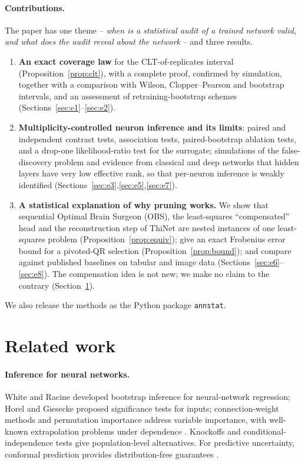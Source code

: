\documentclass[11pt,a4paper]{article}
\theoremstyle{remark}\newtheorem{remark}{Remark}
\begin{document}
\paragraph{Contributions.} The paper has one theme -- \emph{when is a statistical audit of a trained network valid, and what does the audit reveal about the network} -- and three results.
\begin{enumerate}[leftmargin=*,itemsep=1pt]
\item \textbf{An exact coverage law} for the CLT-of-replicates interval (Proposition~\ref{prop:clt}), with a complete proof, confirmed by simulation, together with a comparison with Wilson, Clopper--Pearson and bootstrap intervals, and an assessment of retraining-bootstrap schemes (Sections~\ref{sec:e1}--\ref{sec:e2}).
\item \textbf{Multiplicity-controlled neuron inference and its limits}: paired and independent contrast tests, association tests, paired-bootstrap ablation tests, and a drop-one likelihood-ratio test for the surrogate; simulations of the false-discovery problem and evidence from classical and deep networks that hidden layers have very low effective rank, so that per-neuron inference is weakly identified (Sections~\ref{sec:e3},\ref{sec:e5},\ref{sec:e7}).
\item \textbf{A statistical explanation of why pruning works.} We show that sequential Optimal Brain Surgeon (OBS), the least-squares ``compensated'' head and the reconstruction step of ThiNet are nested instances of one least-squares problem (Proposition~\ref{prop:equiv}); give an exact Frobenius error bound for a pivoted-QR selection (Proposition~\ref{prop:bound}); and compare against published baselines on tabular and image data (Sections~\ref{sec:e6}--\ref{sec:e8}). The compensation idea is not new; we make no claim to the contrary (Section~\ref{sec:related}).
\end{enumerate}
We also release the methods as the Python package \texttt{annstat}.

\section{Related work}\label{sec:related}
\paragraph{Inference for neural networks.} White and Racine \cite{white2001} developed bootstrap inference for neural-network regression; Horel and Giesecke \cite{horel2020} proposed significance tests for inputs; connection-weight methods \cite{garson1991,olden2002} and permutation importance \cite{breiman2001,fisher2019} address variable importance, with well-known extrapolation problems under dependence \cite{hooker2021}. Knockoffs \cite{candes2018} and conditional-independence tests \cite{shah2020} give population-level alternatives. For predictive uncertainty, conformal prediction provides distribution-free guarantees \cite{lei2018,angelopoulos2023}.
\end{document}

